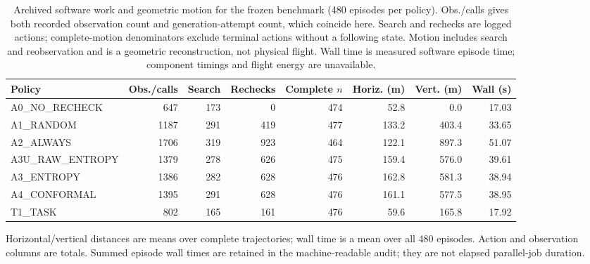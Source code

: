 \begin{table}[!t]
\centering\small
\caption{Archived software work and geometric motion for the frozen benchmark (480 episodes per policy). Obs./calls gives both recorded observation count and generation-attempt count, which coincide here. Search and rechecks are logged actions; complete-motion denominators exclude terminal actions without a following state. Motion includes search and reobservation and is a geometric reconstruction, not physical flight. Wall time is measured software episode time; component timings and flight energy are unavailable.}
\label{tab:cost-audit}
\begin{tabularx}{\textwidth}{@{}Xrrrrrrr@{}}
\toprule
Policy & Obs./calls & Search & Rechecks & Complete $n$ & Horiz. (m) & Vert. (m) & Wall (s)\\
\midrule
A0\_NO\_RECHECK & 647 & 173 & 0 & 474 & 52.8 & 0.0 & 17.03\\
A1\_RANDOM & 1187 & 291 & 419 & 477 & 133.2 & 403.4 & 33.65\\
A2\_ALWAYS & 1706 & 319 & 923 & 464 & 122.1 & 897.3 & 51.07\\
A3U\_RAW\_ENTROPY & 1379 & 278 & 626 & 475 & 159.4 & 576.0 & 39.61\\
A3\_ENTROPY & 1386 & 282 & 628 & 476 & 162.8 & 581.3 & 38.94\\
A4\_CONFORMAL & 1395 & 291 & 628 & 476 & 161.1 & 577.5 & 38.95\\
T1\_TASK & 802 & 165 & 161 & 476 & 59.6 & 165.8 & 17.92\\
\bottomrule
\end{tabularx}
\par\smallskip\footnotesize Horizontal/vertical distances are means over complete trajectories; wall time is a mean over all 480 episodes. Action and observation columns are totals. Summed episode wall times are retained in the machine-readable audit; they are not elapsed parallel-job duration.
\end{table}
